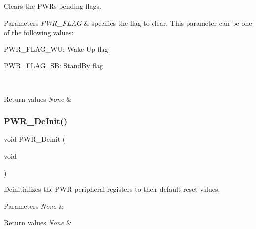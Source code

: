 Clears the P\+WR\textquotesingle{}s pending flags. 


\begin{DoxyParams}{Parameters}
{\em P\+W\+R\+\_\+\+F\+L\+AG} & specifies the flag to clear. This parameter can be one of the following values\+: \begin{DoxyItemize}
\item P\+W\+R\+\_\+\+F\+L\+A\+G\+\_\+\+WU\+: Wake Up flag \item P\+W\+R\+\_\+\+F\+L\+A\+G\+\_\+\+SB\+: Stand\+By flag \end{DoxyItemize}
\\
\hline
\end{DoxyParams}

\begin{DoxyRetVals}{Return values}
{\em None} & \\
\hline
\end{DoxyRetVals}
\mbox{\label{group___p_w_r___exported___functions_gad03a0aac7bc3bc3a9fd012f3769a6990}} 
\subsubsection{\texorpdfstring{PWR\_DeInit()}{PWR\_DeInit()}}
{\footnotesize\ttfamily void P\+W\+R\+\_\+\+De\+Init (\begin{DoxyParamCaption}\item[{void}]{ }\end{DoxyParamCaption})}



Deinitializes the P\+WR peripheral registers to their default reset values. 


\begin{DoxyParams}{Parameters}
{\em None} & \\
\hline
\end{DoxyParams}

\begin{DoxyRetVals}{Return values}
{\em None} & \\
\hline
\end{DoxyRetVals}
\mbox{\label{group___p_w_r___exported___functions_ga00ddae00a9c327b81b24d2597b0052f3}} 

